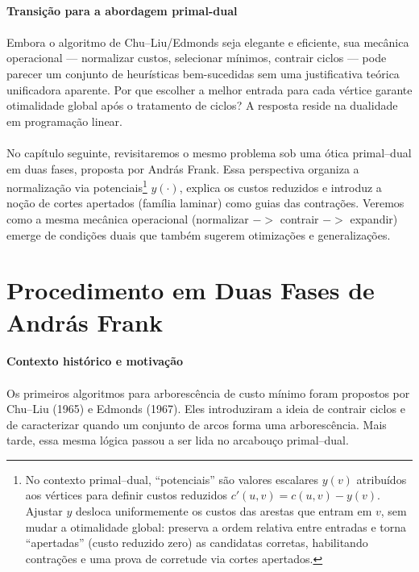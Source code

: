 \documentclass[12pt,a4paper]{article}
\def\emph#1{#1}%
\def\to{->}%
\begin{document}
\paragraph{Transição para a abordagem primal-dual}
\paragraph{}
Embora o algoritmo de Chu–Liu/Edmonds seja elegante e eficiente, sua mecânica operacional — normalizar custos, selecionar mínimos, contrair ciclos — pode parecer um conjunto de heurísticas bem-sucedidas sem uma justificativa teórica unificadora aparente. Por que escolher a melhor entrada para cada vértice garante otimalidade global após o tratamento de ciclos? A resposta reside na \emph{dualidade em programação linear}.

\paragraph{}
No capítulo seguinte, revisitaremos o mesmo problema sob uma ótica primal–dual em duas fases, proposta por András Frank. Essa perspectiva organiza a normalização via potenciais\footnote{No contexto primal–dual, “potenciais” são valores escalares \(y(v)\) atribuídos aos vértices para definir custos reduzidos \(c'(u,v)=c(u,v)-y(v)\). Ajustar \(y\) desloca uniformemente os custos das arestas que entram em \(v\), sem mudar a otimalidade global: preserva a ordem relativa entre entradas e torna “apertadas” (custo reduzido zero) as candidatas corretas, habilitando contrações e uma prova de corretude via cortes apertados.} \(y(\cdot)\), explica os custos reduzidos e introduz a noção de cortes apertados (família laminar) como guias das contrações. Veremos como a mesma mecânica operacional (normalizar \(\to\) contrair \(\to\) expandir) emerge de condições duais que também sugerem otimizações e generalizações.

\section{Procedimento em Duas Fases de András Frank}

\paragraph{Contexto histórico e motivação}
\paragraph{}
Os primeiros algoritmos para arborescência de custo mínimo foram propostos por Chu–Liu (1965) e Edmonds (1967). Eles introduziram a ideia de contrair ciclos e de caracterizar quando um conjunto de arcos forma uma arborescência. Mais tarde, essa mesma lógica passou a ser lida no arcabouço \emph{primal–dual}.
\end{document}
